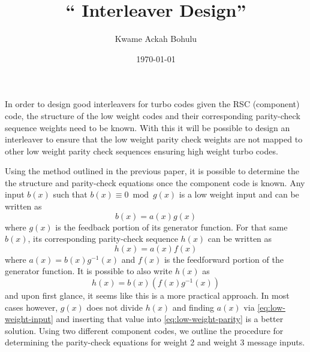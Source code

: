 \documentclass[11pt, oneside, dvipdfmx]{book}
\title{``
Interleaver Design'' }
\author{Kwame Ackah Bohulu}
\date{\today}
\begin{document}
\maketitle
%
In order to design good interleavers for turbo codes given the RSC (component) code, the structure of the low weight codes and their corresponding parity-check sequence weights need to be known. With this it will be possible to design an interleaver to ensure that the low weight parity check weights are not mapped to other low weight parity check sequences ensuring high weight turbo codes.

Using the method outlined in the previous paper, it is possible to determine the the structure and parity-check equations once the component code is known. 
Any input $b(x)$ such that $b(x) \equiv 0 \bmod g(x)$ is a low weight input and can be written as 
\begin{equation}
b(x)=a(x)g(x)
\label{eq:low-weight-input}
\end{equation}
where $g(x)$ is the feedback portion of its generator function. For that same $b(x)$, its corresponding parity-check sequence $h(x)$ can be written as
\begin{equation}
h(x)=a(x)f(x)
\label{eq:low-weight-parity}
\end{equation}
where $a(x)=b(x)g^{-1}(x)$ and $f(x)$ is the feedforward portion of the generator function. It is possible to also write $h(x)$ as 
$$h(x)=b(x)(f(x)g^{-1}(x))$$ and upon first glance, it seems like this is a more practical approach. In most cases however, $g(x)$ does not divide $h(x)$ and finding $a(x)$ via \eqref{eq:low-weight-input} and inserting that value into \eqref{eq:low-weight-parity} is a better solution.
Using two different component codes, we outline the procedure for determining the parity-check equations for weight 2 and weight 3 message inputs.
\end{document}
